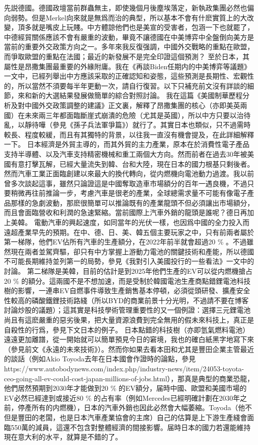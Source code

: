 \documentclass[twocolumn]{ctexart}
\begin{document}
先説德國。德國政壇當前群蟲無主，即使幾個月後塵埃落定，新執政集團必然也偏向弱勢。但是Merkel向來就是無爲而治的典型，所以基本不會有什麽實質上的大改變，頂多就是嘴皮上玩賤。中方體諒他們也是美宣的受害者，包涵一下也就罷了，中德經貿關係應該不會有嚴重的波動，畢竟不讓德國在中美博弈中全盤倒向美方是當前的重要外交政策方向之一。多年來我反復强調，中國外交戰略的重點在歐盟，而爭取歐盟的重點在法國；最近的新發展不是完全印證這個預測？
至於日本，其屬性是昂撒集團最重要的外緣附庸。我在《再談Biden任期内的中美博弈等議題》一文中，已經列舉出中方應該采取的正確認知和姿態，這些預測是長期性、宏觀性的，所以當然不須要每半年更動一次，請自行復習。以下只補充前文沒有詳談的細節，來和新的大選結果發展做簡單的綜合對照討論。
我在這篇《美國制華歷程分析及對中國外交政策調整的建議》正文裏，解釋了昂撒集團的核心（亦即美英兩國）在未來兩三年都面臨斷崖式崩潰的危險（尤其是英國），所以中方只要以治待亂，以靜待嘩（參見《孫子兵法軍爭篇》）就行了。其實日本也類似，只不過需時較長、程度較緩，而且有其獨特的背景，以往我一直沒有機會提及，在此詳細解釋一下。
日本經濟是外貿主導的，而其外貿的主力產業，原本在於消費性電子產品支持半導體、以及汽車支持精密機械和重工兩個大方向。然而前者在過去30年被美國有意打擊瓦解，已經大量流失到韓、台和大陸，現在日本的國力根基只剩後者。然而汽車工業正面臨創建以來最大的換代轉向，從内燃機向電池動力過渡。我以前曾多次談起這事，雖然只論證這是中國奪取造車市場額分的百年一遇良機，不過只要稍微再往前推論一步，考慮汽車是很老的產業，全球總需求量不可能有像電子產品那樣的急劇波動，那麽很簡單可以推論既有的產業龍頭不但必須讓出市場額分，而且會面臨營收和利潤的急速緊縮。當前國際上汽車外銷的龍頭是誰呢？德日再加上美韓。
電動汽車的興起速度，如同當年的光伏一樣，也因爲中國的全力投入而遠超產業早先的預期。在中、德、日、美、韓五個主要玩家之中，只有前兩者屬於第一梯隊，他們EV佔所有汽車的生產額分，在2022年前半就會超過20 \% 。不過雖然現在兩者並駕齊驅，卻只有中方掌握上游動力電池的關鍵技術和產能，所以德國不可能長期維持並列第一的局勢，參見《我對引入美國投行的一些看法》一文中的討論。
第二梯隊是美韓，目前的估計是到2025年他們生產的EV可以從内燃機搶占20 \% 的額分。這兩國不是不想加速，而是受制於韓國電池生產商點錯鋰電池科技樹的影響，一連串EV自燃事件導致生產銷售基本停頓，必須從頭研發、擴產安全性較高的磷酸鐵鋰技術路綫（所以BYD的商業前景十分光明，不過請不要在博客討論炒股的議題）；這其實是科技學術管理重要性的又一個例證：選擇三元鋰電池尚且有這麽嚴重的惡劣後果，把大量資源浪費到完全無用的假未來科技上，真正是自殺性的行爲，參見下文日本的例子。
日本點錯的科技樹（亦即氫氣燃料電池）遠遠更加離譜，從一開始就可以簡單預見今日的窘境，我也的確白紙黑字地寫下來（參見前文《永遠的未來技術》）。然而你如果去看本田和尤其是豐田企業主管最近的談話（例如Akio Toyoda去年在日本國會作證時的論點，參見https://www.autobodynews.com/index.php/industry-news/item/24053-toyota-ceo-going-all-ev-could-cost-japan-millions-of-jobs.html），那真是典型的商業恐龍，他們居然預期到2030年才能做到20 \% 的EV額分，届時中國、歐盟和美國市場的EV必然已經達到或接近80 \% 的占有率（例如Mercedes已經明確計劃在2030年之前，停產所有的内燃機），日本的汽車外銷也因此必然會大幅萎縮。Toyoda（他不但是豐田的老闆，也是日本汽車產業協會的主席）自己的估算是上下游生產綫會面臨550萬的減員，這還不包含對整體經濟的間接影響。届時日本的國力若還能維持現在意大利的水平，就算是不錯的了。
\end{document}
